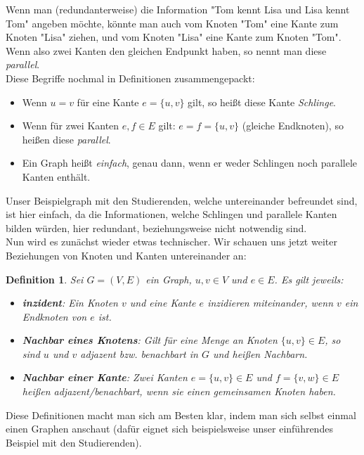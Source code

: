 \documentclass{article}
\newtheorem{definition}{Definition}
\begin{document}
\bigskip
Wenn man (redundanterweise) die Information "Tom kennt Lisa und Lisa kennt Tom" angeben möchte, könnte man auch vom Knoten "Tom" eine Kante zum Knoten "Lisa" ziehen, und vom Knoten "Lisa" eine Kante zum Knoten "Tom". Wenn also zwei Kanten den gleichen Endpunkt haben, so nennt man diese \textit{parallel}.\\
\bigskip
Diese Begriffe nochmal in Definitionen zusammengepackt:\\
\begin{itemize}
	\item Wenn \(u = v\) für eine Kante \(e = \{u, v\}\) gilt, so heißt diese Kante \textit{Schlinge}.
	\item Wenn für zwei Kanten \(e, f \in E\) gilt: \(e = f = \{u, v\}\) (gleiche Endknoten), so heißen diese \textit{parallel}. 
	\item Ein Graph heißt \textit{einfach}, genau dann, wenn er weder Schlingen noch parallele Kanten enthält.
\end{itemize}
Unser Beispielgraph mit den Studierenden, welche untereinander befreundet sind, ist hier einfach, da die Informationen, welche Schlingen und parallele Kanten bilden würden, hier redundant, beziehungsweise nicht notwendig sind.\\

\nepwage
Nun wird es zunächst wieder etwas technischer. Wir schauen uns jetzt weiter Beziehungen von Knoten und Kanten untereinander an:\\
\begin{definition}
    Sei \(G = (V, E)\) ein Graph, \(u, v \in V\) und \(e \in E\).
    Es gilt jeweils:
    \begin{itemize}
        \item \textbf{\textit{inzident}}:
            Ein Knoten \(v\) und eine Kante \(e\) \textit{inzidieren} miteinander, wenn \(v\) ein \textit{Endknoten} von \(e\) ist.
        \item \textbf{\textit{Nachbar eines Knotens}}:
            Gilt für eine Menge an Knoten \(\{u, v\} \in E\), so sind \(u\) und \(v\) \textit{adjazent} bzw. \textit{benachbart} in \(G\) und heißen \textit{Nachbarn}.
        \item \textbf{\textit{Nachbar einer Kante}}:
            Zwei Kanten \(e = \{u, v\} \in E\) und \(f = \{v, w\} \in E\) heißen \textit{adjazent/benachbart}, wenn sie einen gemeinsamen Knoten haben.
    \end{itemize}
\end{definition}
\bigskip
Diese Definitionen macht man sich am Besten klar, indem man sich selbst einmal einen Graphen anschaut (dafür eignet sich beispielsweise unser einführendes Beispiel mit den Studierenden).\\
\end{document}
